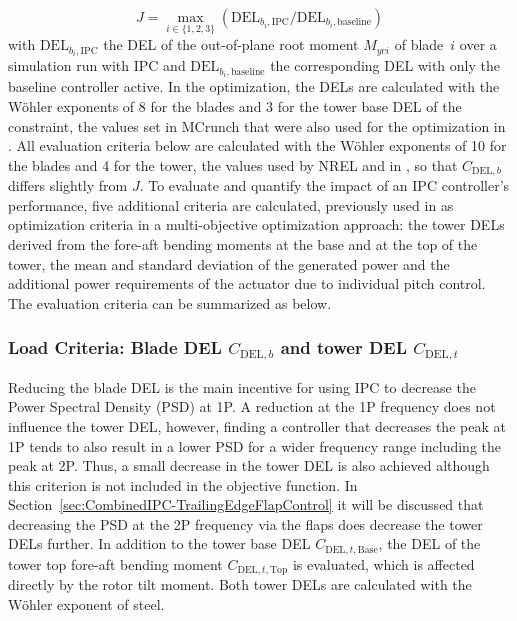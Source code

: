\begin{equation} \label{eq:costFunIPC}
    J = \max_{i \in \{1,2,3\}} \left(\text{DEL}_{b_i,\text{IPC}}/\text{DEL}_{b_i,\text{baseline}}\right)
\end{equation} %
with $\text{DEL}_{b_i,\text{IPC}}$ the DEL of the out-of-plane root moment $M_{yci}$ of blade~$i$ over a simulation run with IPC and $\text{DEL}_{b_i,\text{baseline}}$ the corresponding DEL with only the baseline controller active. In the optimization, the DELs are calculated with the W\"ohler exponents of 8 for the blades and 3 for the tower base DEL of the constraint, the values set in MCrunch that were also used for the optimization in \cite{dittmer2024combined}. All evaluation criteria below are calculated with the W\"ohler exponents of 10 for the blades and 4 for the tower, the values used by NREL and in \cite{hoffmann2018load}, so that $C_{\text{DEL},b}$ differs slightly from $J$.
To evaluate and quantify the impact of an IPC controller's performance, five additional criteria are calculated, previously used in \cite{hoffmann2018load} as optimization criteria in a multi-objective optimization approach: the tower DELs derived from the fore-aft bending moments at the base and at the top of the tower, the mean and standard deviation of the generated power and the additional power requirements of the actuator due to individual pitch control. The evaluation criteria can be summarized as below.

\subsubsection*{Load Criteria: Blade DEL $C_{\text{DEL},b}$ and tower DEL $C_{\text{DEL},t}$}
Reducing the blade DEL is the main incentive for using IPC to decrease the Power Spectral Density (PSD) at 1P. A reduction at the 1P frequency does not influence the tower DEL, however, finding a controller that decreases the peak at 1P tends to also result in a lower PSD for a wider frequency range including the peak at 2P. Thus, a small decrease in the tower DEL is also achieved although this criterion is not included in the objective function. In Section~\ref{sec:CombinedIPC-TrailingEdgeFlapControl} it will be discussed that decreasing the PSD at the 2P frequency via the flaps does decrease the tower DELs further. In addition to the tower base DEL $C_{\text{DEL},t,\text{Base}}$, the DEL of the tower top fore-aft bending moment $C_{\text{DEL},t,\text{Top}}$ is evaluated, which is affected directly by the rotor tilt moment. Both tower DELs are calculated with the Wöhler exponent of steel. 

